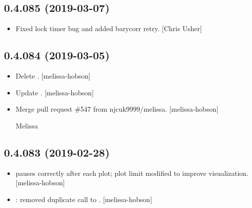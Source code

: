 \documentclass[a4paper,10pt,english]{report}
\begin{document}
\subsection{0.4.085 (2019-03-07)}
\label{\detokenize{misc/changelog:id175}}\begin{itemize}
\item {} 
Fixed lock timer bug and added barycorr retry. {[}Chris Usher{]}

\end{itemize}


\subsection{0.4.084 (2019-03-05)}
\label{\detokenize{misc/changelog:id176}}\begin{itemize}
\item {} 
Delete . {[}melissa-hobson{]}

\item {} 
Update . {[}melissa-hobson{]}

\item {} 
Merge pull request \#547 from njcuk9999/melissa. {[}melissa-hobson{]}

Melissa

\end{itemize}


\subsection{0.4.083 (2019-02-28)}
\label{\detokenize{misc/changelog:id177}}\begin{itemize}
\item {} 
 pauses correctly after each plot;
plot limit modified to improve visualization. {[}melissa-hobson{]}

\item {} 
: removed
duplicate call to . {[}melissa-hobson{]}

\end{itemize}
\end{document}
